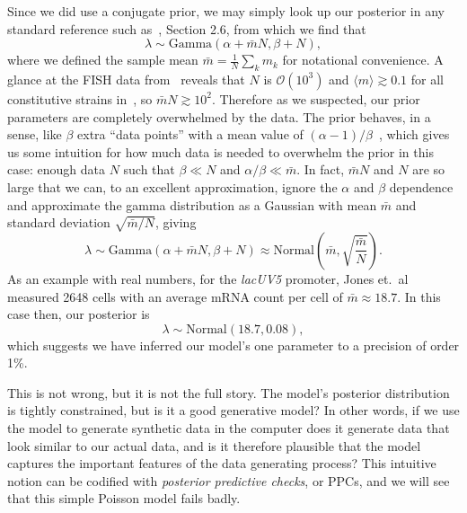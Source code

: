 Since we did use a conjugate prior, we may simply look up our posterior in any
standard reference such as~\cite{Gelman2013}, Section 2.6,
from which we find that
\begin{equation}
\lambda
\sim \text{Gamma}\left(\alpha + \bar{m}N, \beta + N\right),
\end{equation}
where we defined the sample mean $\bar{m} = \frac{1}{N}\sum_k m_k$ for
notational convenience. A glance at the FISH data from~\cite{Jones2014} reveals
that $N$ is $\mathcal{O}(10^3)$ and $\langle m\rangle \gtrsim 0.1$ for all
constitutive strains in~\cite{Jones2014}, so $\bar{m}N \gtrsim 10^2$. Therefore
as we suspected, our prior parameters are completely overwhelmed by the data.
The prior behaves, in a sense, like $\beta$ extra ``data points''
with a mean value of $(\alpha-1)/\beta$~\cite{Gelman2013}, which
gives us some intuition for how much data is needed to overwhelm
the prior in this case: enough data $N$ such that $\beta\ll N$
and $\alpha/\beta \ll \bar{m}$. In
fact, $\bar{m}N$ and $N$ are so large that we can, to an excellent
approximation, ignore the $\alpha$ and $\beta$ dependence and approximate the
gamma distribution as a Gaussian with mean $\bar{m}$ and standard deviation
$\sqrt{\bar{m}/N}$, giving
\begin{equation}
\lambda
\sim \text{Gamma}\left(\alpha + \bar{m}N, \beta + N\right)
\approx \text{Normal}\left(\bar{m}, \sqrt{\frac{\bar{m}}{N}}\right).
\end{equation}
As an example with real numbers, for the \textit{lacUV5} promoter, Jones et.\
al~\cite{Jones2014} measured 2648 cells with an average mRNA count per cell of
$\bar{m} \approx 18.7$. In this case then, our posterior is
\begin{equation}
\lambda
\sim \text{Normal}\left(18.7, 0.08\right),
\label{eq:gauss_posterior}
\end{equation}
which suggests we have inferred our model's one parameter to a precision of
order 1\%.

This is not wrong, but it is not the full story. The model's posterior
distribution is tightly constrained, but is it a good generative model? In other
words, if we use the model to generate synthetic data in the computer does it
generate data that look similar to our actual data, and is it therefore
plausible that the model captures the important features of the data generating
process? This intuitive notion can be codified with \textit{posterior predictive
checks}, or PPCs, and we will see that this simple Poisson model fails badly.

